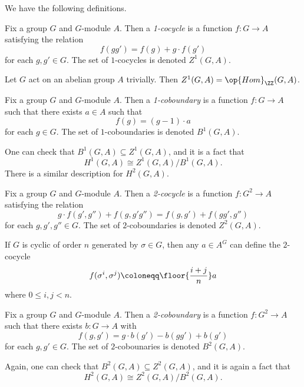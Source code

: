 We have the following definitions.
\begin{definition}
	Fix a group $G$ and $G$-module $A$. Then a \textit{1-cocycle} is a function $f\colon G\to A$ satisfying the relation
	\[f(gg')=f(g)+g\cdot f(g')\]
	for each $g,g'\in G$. The set of $1$-cocycles is denoted $Z^1(G,A)$.
\end{definition}
\begin{example}
	Let $G$ act on an abelian group $A$ trivially. Then $Z^1(G,A)=\op{Hom}_\ZZ(G,A)$.
\end{example}
\begin{definition}
	Fix a group $G$ and $G$-module $A$. Then a \textit{1-coboundary} is a function $f\colon G\to A$ such that there exists $a\in A$ such that
	\[f(g)=(g-1)\cdot a\]
	for each $g\in G$. The set of $1$-coboundaries is denoted $B^1(G,A)$.
\end{definition}
One can check that $B^1(G,A)\subseteq Z^1(G,A)$, and it is a fact that
\[H^1(G,A)\cong Z^1(G,A)/B^1(G,A).\]
There is a similar description for $H^2(G,A)$.
\begin{definition}
	Fix a group $G$ and $G$-module $A$. Then a \textit{2-cocycle} is a function $f\colon G^2\to A$ satisfying the relation
	\[g\cdot f(g',g'')+f(g,g'g'')=f(g,g')+f(gg',g'')\]
	for each $g,g',g''\in G$. The set of $2$-coboundaries is denoted $Z^2(G,A)$.
\end{definition}
\begin{example}
	If $G$ is cyclic of order $n$ generated by $\sigma\in G$, then any $a\in A^G$ can define the $2$-cocycle
	\[f(\sigma^i,\sigma^j)\coloneqq\floor{\frac{i+j}n}a\]
	where $0\le i,j<n$.
\end{example}
\begin{definition}
	Fix a group $G$ and $G$-module $A$. Then a \textit{2-coboundary} is a function $f\colon G^2\to A$ such that there exists $b\colon G\to A$ with
	\[f(g,g')=g\cdot b(g')-b(gg')+b(g')\]
	for each $g,g'\in G$. The set of $2$-cobounaries is denoted $B^2(G,A)$.
\end{definition}
Again, one can check that $B^2(G,A)\subseteq Z^2(G,A)$, and it is again a fact that
\[H^2(G,A)\cong Z^2(G,A)/B^2(G,A).\]

